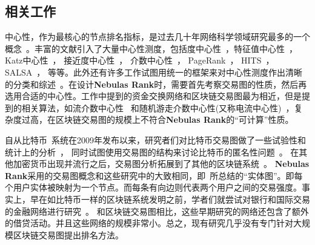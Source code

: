 \newpage 

\subsection{相关工作} \label{subsec:related}
中心性，作为最核心的节点排名指标，是过去几十年网络科学领域研究最多的一个概念~\cite{newman2010networks}。丰富的文献引入了大量中心性测度，包括度中心性~\cite{freeman1979set}，特征值中心性~\cite{bonacich1972factoring}，Katz中心性~\cite{katz1953new}， 接近度中心性~\cite{sabidussi1966centrality}， 介数中心性~\cite{freeman1977set}\cite{freeman1978centrality}\cite{freeman1991centrality}\cite{noh2004random}\cite{newman2005measure}， PageRank~\cite{Brin2010}， HITS~\cite{kleinberg1999authoritative}， SALSA~\cite{Science2001}， 等等。此外还有许多工作试图用统一的框架来对中心性测度作出清晰的分类和综述~\cite{Borgatti2005}\cite{Borgatti2006}\cite{Lu2016}。在设计\textbf{Nebulas Rank}时，需要首先考察交易图的性质，然后再选用合适的中心性。\textcite{Borgatti2005}工作中提到的资金交换网络和区块链交易图最为相近，但是提到的相关算法，如流介数中心性~\cite{freeman1991centrality} 和随机游走介数中心性(又称电流中心性)~\cite{newman2005measure}，复杂度过高，在区块链交易图的规模上不符合\textbf{Nebulas Rank}的“可计算”性质。

自从比特币~\cite{Nakamoto2008}系统在2009年发布以来，研究者们对比特币交易图做了一些试验性和统计上的分析~\cite{Ron}\cite{Haslhofer}\cite{NielKondor2014}\cite{Baumann2014}， 同时试图使用交易图的结构来讨论比特币的匿名性问题~\cite{Meiklejohn2013}\cite{Ober2013}\cite{pham2016anomaly}\cite{Fleder2015}\cite{Ferrin2015}。 在其他加密货币出现并流行之后，交易图分析拓展到了其他的区块链系统~\cite{Chang2017}\cite{Anderson2016}。 \textbf{Nebulas Rank}采用的交易图概念和这些研究中的大致相同，即~\textcite{Tschorsch2015}所总结的“实体图”。即每个用户实体被映射为一个节点。而每条有向边则代表两个用户之间的交易强度。事实上，早在如比特币一样的区块链系统发明之前，学者们就尝试对银行和国际交易的金融网络进行研究~\cite{propper2008towards}\cite{Boss2004}\cite{Serrano2007}\cite{Bech2008}\cite{Fagiolo2009}\cite{Morten2006}\cite{Boss2004a}\cite{Krempel2002}\cite{Serrano2003}。 和区块链交易图相比，这些早期研究的网络还包含了额外的借贷活动。并且这些网络的规模非常小。总之，现有研究几乎没有专门针对大规模区块链交易图提出排名方法。

